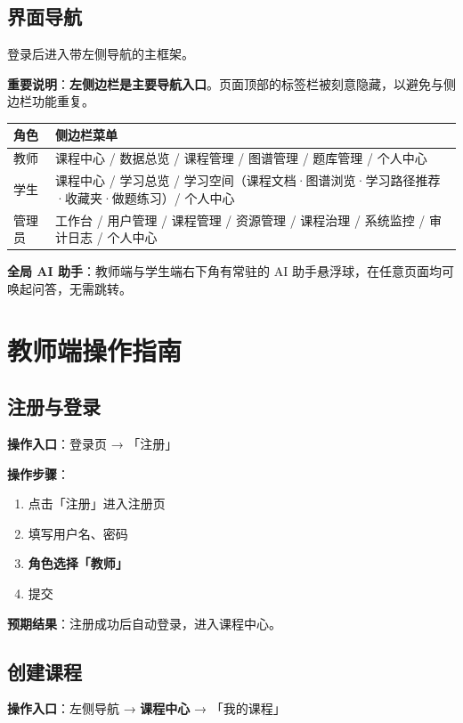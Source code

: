 \documentclass[UTF8,a4paper,11pt]{ctexrep}
\begin{document}
\subsection{界面导航}

登录后进入带左侧导航的主框架。

\textbf{重要说明}：\textbf{左侧边栏是主要导航入口}。页面顶部的标签栏被刻意隐藏，以避免与侧边栏功能重复。

\begin{center}
\small
\begin{tabularx}{\linewidth}{@{}XX@{}}
\toprule
角色 & 侧边栏菜单 \\
\midrule
教师 & 课程中心 / 数据总览 / 课程管理 / 图谱管理 / 题库管理 / 个人中心 \\
学生 & 课程中心 / 学习总览 / 学习空间（课程文档·图谱浏览·学习路径推荐·收藏夹·做题练习）/ 个人中心 \\
管理员 & 工作台 / 用户管理 / 课程管理 / 资源管理 / 课程治理 / 系统监控 / 审计日志 / 个人中心 \\
\bottomrule
\end{tabularx}
\end{center}
\textbf{全局 AI 助手}：教师端与学生端右下角有常驻的 AI 助手悬浮球，在任意页面均可唤起问答，无需跳转。


\section{教师端操作指南}


\subsection{注册与登录}

\textbf{操作入口}：登录页 → 「注册」

\textbf{操作步骤}：

\begin{enumerate}
\item 点击「注册」进入注册页
\item 填写用户名、密码
\item \textbf{角色选择「教师」}
\item 提交
\end{enumerate}
\textbf{预期结果}：注册成功后自动登录，进入课程中心。


\subsection{创建课程}

\textbf{操作入口}：左侧导航 → \textbf{课程中心} → 「我的课程」
\end{document}
